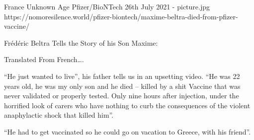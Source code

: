 {France}
{Unknown Age}
{Pfizer/BioNTech}
{26th July 2021}
{-}
{picture.jpg}
{https://nomoresilence.world/pfizer-biontech/maxime-beltra-died-from-pfizer-vaccine/}
{


Frédéric Beltra Tells the Story of his Son Maxime:

Translated From French….

“He just wanted to live”, his father tells us in an upsetting video. “He was 22 years old, he was my only son and he died – killed by a shit Vaccine that was never validated or properly tested. Only nine hours after injection, under the horrified look of carers who have nothing to curb the consequences of the violent anaphylactic shock that killed him”.

“He had to get vaccinated so he could go on vacation to Greece, with his friend”.
}
